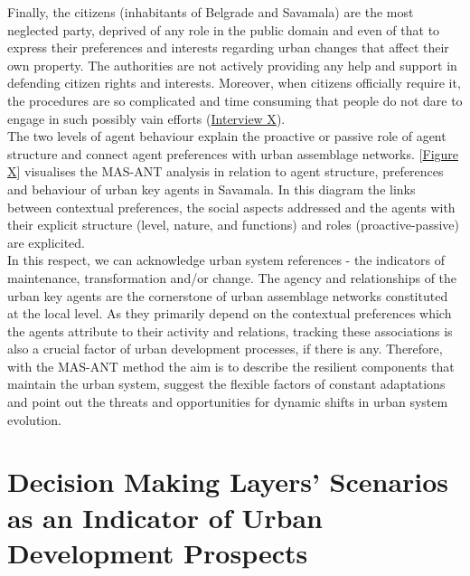 \documentclass[11pt]{report}
\begin{document}
{{{Finally, the citizens (inhabitants of Belgrade and Savamala) are the most neglected party, deprived of any role in the public domain and even of that to express their preferences and interests regarding urban changes that affect their own property. The authorities are not actively providing any help and support in defending citizen rights and interests. Moreover, when citizens officially require it, the procedures are so complicated and time consuming that people do not dare to engage in such possibly vain efforts 
(\href{InterviewX}{Interview X}).
\\

The two levels of agent behaviour explain the proactive or passive role of agent structure and connect agent preferences with urban assemblage networks. 
[\href{FigureX}{Figure X}] visualises the MAS-ANT analysis in relation to agent structure, preferences and behaviour of urban key agents in Savamala.
In this diagram the links between contextual preferences, the social aspects addressed and the agents with their explicit structure (level, nature, and functions) and roles (proactive-passive) are explicited.
\\

In this respect, we can acknowledge urban system references - the indicators of maintenance, transformation and/or change.
The agency and relationships of the urban key agents are the cornerstone of urban assemblage networks constituted at the local level.
As they primarily depend on the contextual preferences which the agents attribute to their activity and relations, tracking these associations is also a crucial factor of urban development processes, if there is any.
Therefore, with the MAS-ANT method the aim is to describe the resilient components that maintain the urban system, suggest the flexible factors of constant adaptations and point out the threats and opportunities for dynamic shifts in urban system evolution.



\section{Decision Making Layers' Scenarios as an Indicator of Urban Development Prospects}

}}}
\end{document}
